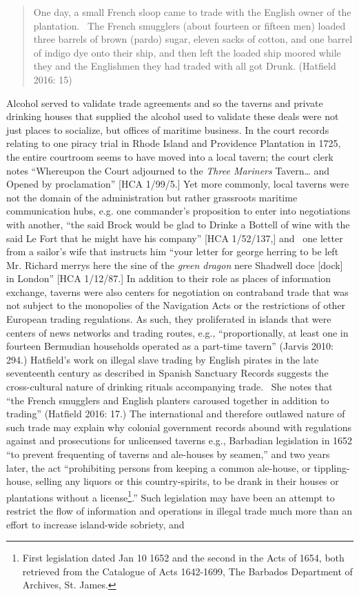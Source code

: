 \documentclass[12pt]{article}
\newenvironment{styleStandard}{\renewcommand\baselinestretch{1.0}\setlength\leftskip{0cm}\setlength\rightskip{0cm plus 1fil}\setlength\parindent{0cm}\setlength\parfillskip{0pt plus 1fil}\setlength\parskip{0in plus 1pt}\writerlistparindent\writerlistleftskip\leavevmode\normalfont\normalsize\writerlistlabel\ignorespaces}{\unskip\vspace{0in plus 1pt}\par}
\newcommand\writerlistleftskip{}
\newcommand\writerlistparindent{}
\newcommand\writerlistlabel{}
\begin{document}
\begin{quotation}
One day, a small French sloop came to trade with the English owner of the plantation. \ The French smugglers (about fourteen or fifteen men) loaded three barrels of brown (pardo) sugar, eleven sacks of cotton, and one barrel of indigo dye onto their ship, and then left the loaded ship moored while they and the Englishmen they had traded with all got Drunk. (Hatfield 2016: 15) 

\end{quotation}
\begin{styleStandard}
Alcohol served to validate trade agreements and so the taverns and private drinking houses that supplied the alcohol used to validate these deals were not just places to socialize, but offices of maritime business. In the court records relating to one piracy trial in Rhode Island and Providence Plantation in 1725, the entire courtroom seems to have moved into a local tavern; the court clerk notes “Whereupon the Court adjourned to the \textit{Three Mariners} Tavern… and Opened by proclamation” [HCA 1/99/5.] Yet more commonly, local taverns were not the domain of the administration but rather grassroots maritime communication hubs, e.g. one commander’s proposition to enter into negotiations with another, “the said Brock would be glad to Drinke a Bottell of wine with the said Le Fort that he might have his company” [HCA 1/52/137,] and \ one letter from a sailor’s wife that instructs him “your letter for george herring to be left Mr. Richard merrys here the sine of the \textit{green dragon} nere Shadwell doce [dock] in London” [HCA 1/12/87.] In addition to their role as places of information exchange, taverns were also centers for negotiation on contraband trade that was not subject to the monopolies of the Navigation Acts or the restrictions of other European trading regulations. As such, they proliferated in islands that were centers of news networks and trading routes, e.g., “proportionally, at least one in fourteen Bermudian households operated as a part-time tavern” (Jarvis 2010: 294.) Hatfield’s work on illegal slave trading by English pirates in the late seventeenth century as described in Spanish Sanctuary Records suggests the cross-cultural nature of drinking rituals accompanying trade. \ She notes that “the French smugglers and English planters caroused together in addition to trading” (Hatfield 2016: 17.) The international and therefore outlawed nature of such trade may explain why colonial government records abound with regulations against and prosecutions for unlicensed taverns e.g., Barbadian legislation in 1652 “to prevent frequenting of taverns and ale-houses by seamen,” and two years later, the act “prohibiting persons from keeping a common ale-house, or tippling-house, selling any liquors or this country-spirits, to be drank in their houses or plantations without a license\footnote{ First legislation dated Jan 10 1652 and the second in the Acts of 1654, both retrieved from the Catalogue of Acts 1642-1699, The Barbados Department of Archives, St. James.}.” Such legislation may have been an attempt to restrict the flow of information and operations in illegal trade much more than an effort to increase island-wide sobriety, and 
\end{styleStandard}
\end{document}
